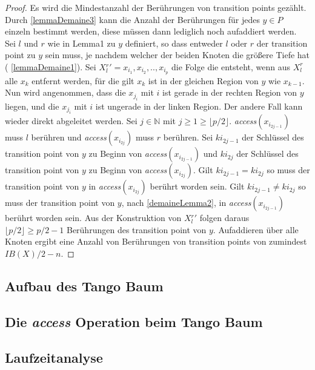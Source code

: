 \documentclass[a4paper,12pt]{article}
\begin{document}
\begin{proof}
Es wird die Mindestanzahl der Berührungen von transition points gezählt. Durch \ref{lemmaDemaine3} kann die Anzahl der Berührungen für jedes $y \in P$ einzeln bestimmt werden, diese müssen dann lediglich noch aufaddiert werden. Sei $l$ und $r$ wie in Lemma1 zu $y$ definiert, so dass entweder $l$ oder $r$ der transition point zu $y$ sein muss, je nachdem welcher der beiden Knoten die größere Tiefe hat ( \ref{lemmaDemaine1}). Sei $X{^r_l}' = x_{i_1},x_{i_2},..,x_{i_p}$ die Folge die entsteht, wenn aus $X^r_l$ alle $x_k$ entfernt werden, für die gilt $x_k$ ist in der gleichen Region von $y$ wie $x_{k-1}$. Nun wird angenommen, dass die $x_{j_i}$ mit $i$ ist gerade in der rechten Region von $y$ liegen, und die $x_{j_i}$ mit $i$ ist ungerade in der linken Region. Der andere Fall kann wieder direkt abgeleitet werden. Sei $j \in \mathbb{N}$ mit $j \geq 1 \geq \lfloor p / 2 \rfloor$. \textit{access}$\left( x_{i_{2j-1}} \right)$ muss $l$ berühren und \textit{access}$\left( x_{i_{2j}} \right)$ muss $r$ berühren. Sei $k{i_{2j-1}}$ der Schlüssel des transition point von $y$ zu Beginn von \textit{access}$\left( x_{i_{2j-1}} \right)$ und  $k{i_{2j}}$ der Schlüssel des transition point von $y$ zu Beginn von \textit{access}$\left( x_{i_{2j}} \right)$. Gilt $k{i_{2j-1}} = k{i_{2j}}$ so muss der transition point von $y$ in \textit{access}$\left( x_{i_{2j}} \right)$ berührt worden sein.  Gilt $k{i_{2j-1}} \ne k{i_{2j}}$ so muss der transition point von $y$, nach \ref{demaineLemma2}, in \textit{access}$\left( x_{i_{2j-1}} \right)$ berührt worden sein. Aus der Konstruktion von $X{^r_l}'$ folgen daraus $\lfloor p/2 \rfloor \geq p/2 - 1$ Berührungen des transition point von $y$. Aufaddieren über alle Knoten ergibt  eine Anzahl von Berührungen von transition points von zumindest $\mathit{IB}\left(X\right) /2 - n$.
	
\end{proof}















\subsection{Aufbau des Tango Baum} \label{aufbauDesTango}
\subsection{Die \textit{access} Operation beim Tango Baum}
\subsection{Laufzeitanalyse}
\newpage


\end{document}
